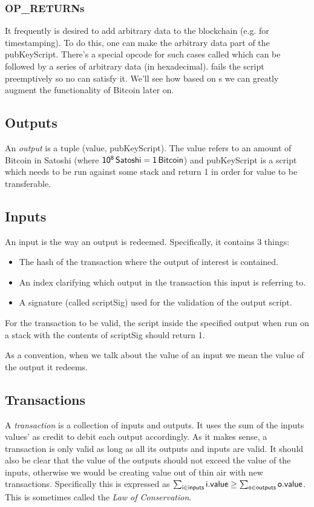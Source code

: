 \subsubsection{OP\_RETURNs}
It frequently is desired to add arbitrary data to the blockchain (e.g. for timestamping). To do this, one can make the arbitrary data part of the \textsf{pubKeyScript}. There's a special opcode for such cases called  which can be followed by a series of arbitrary data (in hexadecimal).  fails the script preemptively so no  can satisfy it. We'll see how based on s we can greatly augment the functionality of Bitcoin later on.

\subsection{Outputs}
An \emph{output} is a tuple ({\sf value, pubKeyScript}). The \textsf{value} refers to an amount of Bitcoin in Satoshi (where $\sf 10^8 \, Satoshi = 1 \, Bitcoin$) and \textsf{pubKeyScript} is a script which needs to be run against some stack and return 1 in order for \textsf{value} to be transferable.

\subsection{Inputs}
An input is the way an output is redeemed. Specifically, it contains 3 things:
\begin{itemize}
  \item The hash of the transaction where the output of interest is contained.
  \item An index clarifying which output in the transaction this input is referring to.
  \item A signature (called \textsf{scriptSig}) used for the validation of the output script.
\end{itemize}

For the transaction to be valid, the script inside the specified output when run on a stack with the contents of \textsf{scriptSig} should return 1.

As a convention, when we talk about the value of an input we mean the value of the output it redeems.

\subsection{Transactions}
A \emph{transaction} is a collection of inputs and outputs. It uses the sum of the inputs values' as credit to debit each output accordingly. As it makes sense, a transaction is only valid as long as all its outputs and inputs are valid. It should also be clear that the value of the outputs should not exceed the value of the inputs, otherwise we would be creating value out of thin air with new transactions. Specifically this is expressed as $\sum_{\sf i \in inputs} {\sf i.value} \ge \sum_{\sf o \in outputs} {\sf o.value}$. This is sometimes called the \emph{Law of Conservation}.

